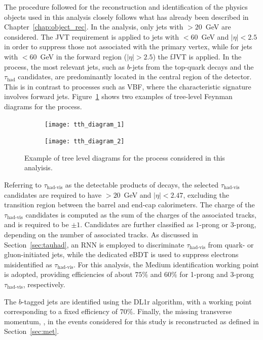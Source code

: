The procedure followed for the reconstruction and identification of the physics objects used in this analysis closely follows what has already been described in Chapter~\ref{chap:object_rec}.  
In the \ttHtt analysis, only jets with \pt$>20$~GeV are considered. The JVT requirement is applied to jets with \pt$ < 60$~GeV and $|\eta| < 2.5$ in order to suppress those not associated with the primary vertex, while for jets with \pt$ < 60$~GeV in the forward region ($|\eta| > 2.5$) the fJVT is applied. In the \ttHtt process, the most relevant jets, such as $b$-jets from the top-quark decays and the $\tau_{\text{had}}$ candidates, are predominantly located in the central region of the detector. This is in contrast to processes such as VBF, where the characteristic signature involves forward jets. Figure~\ref{fig:tth_topo} shows two examples of tree-level Feynman diagrams for the \ttHtt process.
\begin{figure}[htbp]
    \centering
    \begin{subfigure}[b]{0.48\textwidth}
        \texttt{[image: tth\_diagram\_1]}
    \end{subfigure}
    \hfill
    \begin{subfigure}[b]{0.48\textwidth}
        \texttt{[image: tth\_diagram\_2]}
    \end{subfigure}
    \hfill
    \caption{Example of tree level diagrams for the \ttHtt process considered in this analyisis.}
    \label{fig:tth_topo}
\end{figure}
\FloatBarrier
Referring to $\tau_{\text{had-vis}}$ as the detectable products of \tauhad decays, the selected $\tau_{\text{had-vis}}$ candidates are required to have \pt$ > 20$~GeV and $|\eta| < 2.47$, excluding the transition region between the barrel and end-cap calorimeters. The charge of the $\tau_{\text{had-vis}}$ candidates is computed as the sum of the charges of the associated tracks, and is required to be $\pm 1$. Candidates are further classified as 1-prong or 3-prong, depending on the number of associated tracks. As discussed in Section~\ref{sec:tauhad}, an RNN is employed to discriminate $\tau_{\text{had-vis}}$ from quark- or gluon-initiated jets, while the dedicated eBDT is used to suppress electrons misidentified as $\tau_{\text{had-vis}}$. For this analysis, the Medium identification working point is adopted, providing efficiencies of about $75\%$ and $60\%$ for 1-prong and 3-prong $\tau_{\text{had-vis}}$, respectively.  

The $b$-tagged jets are identified using the DL1r algorithm, with a working point corresponding to a fixed efficiency of $70\%$.  
Finally, the missing transverse momentum, \etmiss, in the events considered for this study is reconstructed as defined in Section~\ref{sec:met}.

